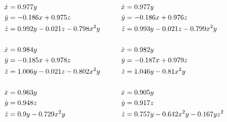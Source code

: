 \begin{equation}
\normalspacing
\begin{aligned}
\dot{x} &= 0.977 y                         &\dot{x} &= 0.977 y \\
\dot{y} &= -0.186 x + 0.975 z              &\dot{y} &= -0.186 x + 0.976 z \\
\dot{z} &= 0.992 y - 0.021 z - 0.798 x^2 y \qquad &\dot{z} &= 0.993 y - 0.021 z - 0.799 x^2 y \\
\\
\dot{x} &= 0.984 y                         &\dot{x} &= 0.982 y \\
\dot{y} &= -0.185 x + 0.978 z              &\dot{y} &= -0.187 x + 0.979 z \\
\dot{z} &= 1.006 y - 0.021 z - 0.802 x^2 y &\dot{z} &= 1.046 y - 0.81 x^2 y \\
\\
\dot{x} &= 0.963 y             &\dot{x} &= 0.905 y \\
\dot{y} &= 0.948 z             &\dot{y} &= 0.917 z \\
\dot{z} &= 0.9 y - 0.729 x^2 y &\dot{z} &= 0.757 y - 0.642 x^2 y - 0.167 y z^2
\end{aligned}
\end{equation}